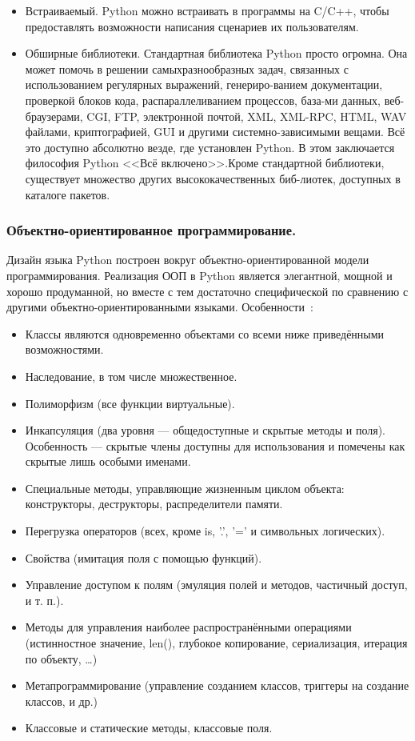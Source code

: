 \begin{itemize}
  \item Встраиваемый. Python можно встраивать в программы на C/C++, чтобы предоставлять возможности написания сценариев их пользователям.
  \item Обширные библиотеки. Стандартная библиотека Python просто огромна. Она может помочь в решении самыхразнообразных задач, связанных с использованием регулярных выражений, генериро-ванием документации, проверкой блоков кода, распараллеливанием процессов, база-ми данных, веб-браузерами, CGI, FTP, электронной почтой, XML, XML-RPC, HTML, WAV файлами, криптографией, GUI и другими системно-зависимыми вещами. Всё это доступно абсолютно везде, где установлен Python. В этом заключается философия Python <<Всё включено>>.Кроме стандартной библиотеки, существует множество других высококачественных биб-лиотек, доступных в каталоге пакетов.
\end{itemize}

\subsubsection{Объектно-ориентированное программирование. }
Дизайн языка Python построен вокруг объектно-ориентированной модели программирования. Реализация ООП в Python является элегантной, мощной и хорошо продуманной, но вместе с тем достаточно специфической по сравнению с другими объектно-ориентированными языками. Особенности~\cite{wiki_python, byte_of_python}:
\begin{itemize}
\item Классы являются одновременно объектами со всеми ниже приведёнными возможностями.
\item Наследование, в том числе множественное.
\item Полиморфизм (все функции виртуальные).
\item Инкапсуляция (два уровня — общедоступные и скрытые методы и поля). Особенность — скрытые члены доступны для использования и помечены как скрытые лишь особыми именами.
\item Специальные методы, управляющие жизненным циклом объекта: конструкторы, деструкторы, распределители памяти.
\item Перегрузка операторов (всех, кроме is, '.', '=' и символьных логических).
\item Свойства (имитация поля с помощью функций).
\item Управление доступом к полям (эмуляция полей и методов, частичный доступ, и т. п.).
\item Методы для управления наиболее распространёнными операциями (истинностное значение, len(), глубокое копирование, сериализация, итерация по объекту, …)
\item Метапрограммирование (управление созданием классов, триггеры на создание классов, и др.)
\item Классовые и статические методы, классовые поля.
\end{itemize}

